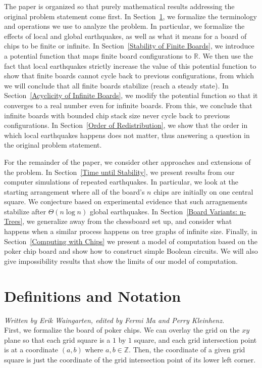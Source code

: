 \documentclass[runningheads,a4paper]{llncs}
\begin{document}
The paper is organized so that purely mathematical results addressing the original problem statement come first. In Section~\ref{Definitions and Notation}, we formalize the terminology and operations we use to analyze the problem. In particular, we formalize the effects of local and global earthquakes, as well as what it means for a board of chips to be finite or infinite. In Section~\ref{Stability of Finite Boards}, we introduce a potential function that maps finite board configurations to $\mathbb{R}$. We then use the fact that local earthquakes strictly increase the value of this potential function to show that finite boards cannot cycle back to previous configurations, from which we will conclude that all finite boards stabilize (reach a steady state). In Section~\ref{Acyclicity of Infinite Boards}, we modify the potential function so that it converges to a real number even for infinite boards. From this, we conclude that infinite boards with bounded chip stack size never cycle back to previous configurations. In Section~\ref{Order of Redistribution}, we show that the order in which local earthquakes happens does not matter, thus answering a question in the original problem statement.

For the remainder of the paper, we consider other approaches and extensions of the problem. In  Section~\ref{Time until Stability}, we present results from our computer simulations of repeated earthquakes. In particular, we look at the starting arrangement where all of the board's $n$ chips are initially on one central square. We conjecture based on experimental evidence that such arragnements stabilize after $\Theta(n \log n)$ global earthquakes. In Section~\ref{Board Variants: n-Trees}, we generalize away from the chessboard set up, and consider what happens when a similar process happens on tree graphs of infinite size. Finally, in Section~\ref{Computing with Chips} we present a model of computation based on the poker chip board and show how to construct simple Boolean circuits. We will also give impossibility results that show the limits of our model of computation.
\section{Definitions and Notation}
\label{Definitions and Notation}

\emph{Written by Erik Waingarten, edited by Fermi Ma and Perry Kleinhenz.}\\

First, we formalize the board of poker chips. We can overlay the grid on the $xy$ plane so that each grid square is a $1$ by $1$ square, and each grid intersection point is at a coordinate $(a,b)$ where $a,b \in \mathbb{Z}$. Then, the coordinate of a given grid square is just the coordinate of the grid intersection point of its lower left corner. 
\end{document}
